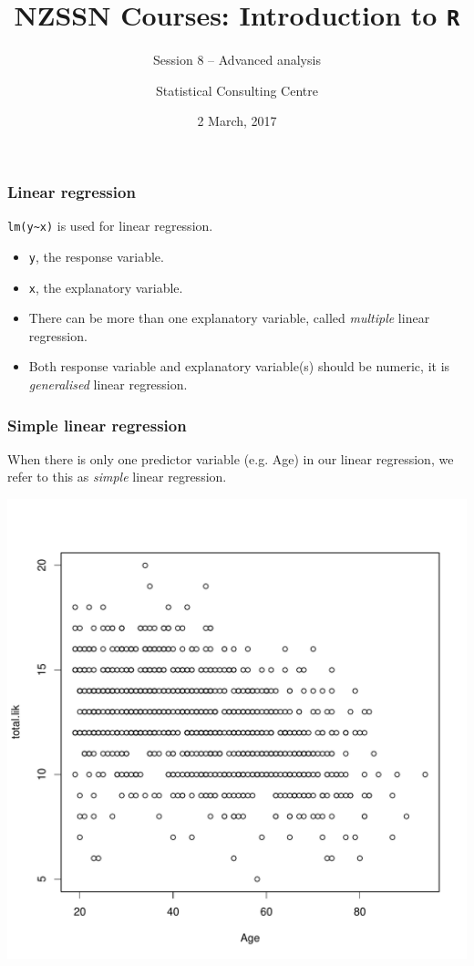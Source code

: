 \documentclass{beamer}\usepackage[]{graphicx}\usepackage[]{color}
\author[SCC]{Statistical Consulting Centre}%
\institute[\href{mailto:consulting@stat.auckland.ac.nz}
  {consulting@stat.auckland.ac.nz}]{\href{mailto:consulting@stat.auckland.ac.nz}
  {consulting@stat.auckland.ac.nz}\\
  k.chang@auckland.ac.nz\\
The Department of Statistics\\
The University of Auckland}
\title[Session 8 -- Advanced analysis]{NZSSN Courses: Introduction
to \texttt{R}}
\subtitle{Session 8 -- Advanced analysis}
\date{2 March, 2017}
\newenvironment{knitrout}{}{} %
\begin{document}
\maketitle
 
\begin{frame}[fragile]
  \frametitle{Linear regression}

\verb|lm(y~x)| is used for linear regression.
  \begin{itemize}
  \item \texttt{y}, the response variable.
  \item \texttt{x}, the explanatory variable.   
  \item There can be more than one explanatory variable, called {\em multiple} linear regression. 
  \item Both response variable and explanatory variable(s) should be numeric, it is {\em generalised} linear regression.
  \end{itemize}
\end{frame} 

\begin{frame}[fragile]
\frametitle{Simple linear regression}
When there is only one predictor variable (e.g. Age) in our linear regression, we refer to this as {\em simple} linear regression.
\begin{knitrout}
\color{fgcolor}

{\centering \includegraphics[width=0.6\linewidth]{figure/unnamed-chunk-2-1} 

}



\end{knitrout}
\end{frame} 
\end{document}

